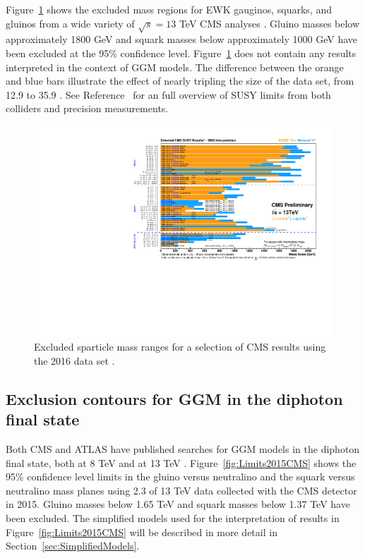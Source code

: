 Figure~\ref{fig:CMSexclusions} shows the excluded mass regions for EWK gauginos, squarks, and gluinos
from a wide variety of $\sqrt{s} = 13$ TeV CMS analyses \cite{SUSYtwiki}. Gluino masses below approximately 1800 GeV and 
squark masses below approximately 1000 GeV have been excluded at the 95\% confidence level. 
Figure~\ref{fig:CMSexclusions} does not contain any results interpreted in the context of GGM models.
The difference between the orange and blue bars illustrate the effect of nearly tripling the size of the
data set, from 12.9 \fbinv to 35.9 \fbinv. See Reference~\cite{pdgReview} for an full overview of SUSY 
limits from both colliders and precision measurements.

\begin{figure}
    \centering
      \includegraphics[width=.9\textwidth]{Figures/Theory/Moriond2017_BarPlot.pdf}
    \caption[Excluded sparticle mass ranges for a selection of CMS results using the 2016 data set.]
    {Excluded sparticle mass ranges for a selection of CMS results using the 2016 data set \cite{SUSYtwiki}.}
    \label{fig:CMSexclusions}
\end{figure}

\subsection{Exclusion contours for GGM in the diphoton final state}
\label{sec:GMSBlimits}
Both CMS and ATLAS have published searches for GGM models in the diphoton final state, both at 8 TeV \cite{Aad:2015hea,Khachatryan:2015exa} and at 13 TeV \cite{ATLAS:2016aa,CMS:2015_anal}. Figure~\ref{fig:Limits2015CMS} shows the 95\% confidence level limits in the gluino versus neutralino and the squark versus neutralino mass planes using 2.3 \fbinv of 13 TeV data collected with the CMS detector in 2015. 
Gluino masses below 1.65 TeV and squark masses below 1.37 TeV have been excluded.
The simplified models used for the interpretation of results in Figure~\ref{fig:Limits2015CMS} will be described in more detail in Section~\ref{sec:SimplifiedModels}.

